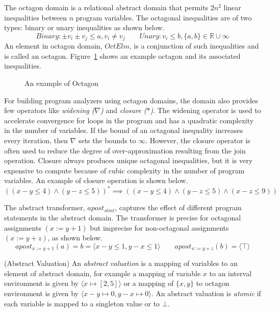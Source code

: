 The octagon domain is a relational abstract domain that permits $2n^2$ 
linear inequalities between $n$ program variables.  The octagonal 
inequalities are of two types: binary or unary inequalities as shown below.
\[Binary: \pm v_i \pm v_j \leq a, v_i \neq v_j \qquad Unary: v_i \leq b, \{a, b\} \in \mathbb{R} \cup \infty \]  
An element in octagon domain, $OctElm$, is a conjunction of such 
inequalities and is called an octagon.  Figure~\ref{octagon} shows an 
example octagon and its associated inequalities.   
%
\begin{wrapfigure}{r}{5.5cm}
\caption{An example of Octagon}\label{octagon}
\end{wrapfigure} 
%
For building program analyzers using octagon domains, the domain also 
provides few operators like {\em widening ($\nabla$)} and {\em closure ($*$)}.  
The widening operator is used to accelerate convergence for loops in the program
and has a quadratic complexity in the number of variables.  If the bound of an 
octagonal inequality increases every iteration, then $\nabla$ sets the bounds 
to $\infty$.  However, the closure operator is often used to reduce the degree 
of over-approximation resulting from the join operation. Closure always produces 
unique octagonal inequalities, but it is very expensive to compute because of 
cubic complexity in the number of program variables. An example of closure
operation is shown below.
\[((x-y \leq 4) \wedge (y-z \leq 5))^* \implies ((x-y \leq 4) \wedge (y-z \leq 5) \wedge (x-z \leq 9)) \]  
 
The abstract transformer, $apost_{stmt}$, captures the effect of different program 
statements in the abstract domain. The transformer is precise for octagonal 
assignments $(x:=y+1)$ but imprecise for non-octagonal assignments $(x:=y+z)$, 
as shown below.
\[apost_{x:=y+1}(a) = b = \langle x-y \leq 1, y-x \leq 1 \rangle \qquad apost_{x:=y+z}(b) = \langle \top \rangle \]  

\begin{definition}{(Abstract Valuation)} An {\em abstract valuation} is a
mapping of variables to an element of abstract domain, for example 
a mapping of variable $x$ to an interval environment is given by 
$\langle x \mapsto [2,5] \rangle$ or a mapping of $\{x,y\}$ to octagon 
environment is given by $\langle x-y \mapsto 0, y-x \mapsto 0 \rangle$.  
An abstract valuation is {\em atomic} if each variable is mapped to a singleton 
value or to $\bot$.  
\end{definition}

